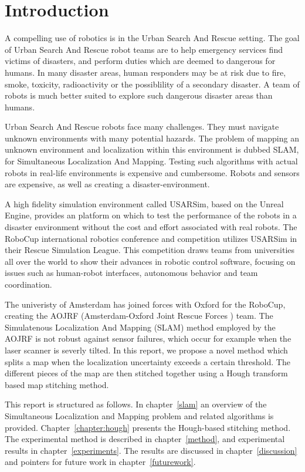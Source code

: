 \chapter{Introduction}
\label{chapter:introduction}
A compelling use of robotics is in the Urban Search And Rescue setting. The goal of Urban Search And Rescue robot teams are to help emergency services find victims of disasters, and perform duties which are deemed to dangerous for humans. In many disaster areas, human responders may be at risk due to fire, smoke, toxicity, radioactivity or the possiblility of a secondary disaster. A team of robots is much better suited to explore such dangerous disaster areas than humans. 

Urban Search And Rescue robots face many challenges. They must navigate unknown environments with many potential hazards. The problem of mapping an unknown environment and localization within this environment is dubbed SLAM, for Simultaneous Localization And Mapping. Testing such algorithms with actual robots in real-life environments is expensive and cumbersome. Robots and sensors are expensive, as well as creating a disaster-environment. 

A high fidelity simulation environment called USARSim, based on the Unreal Engine, provides an platform on which to test the performance of the robots in a disaster environment without the cost and effort associated with real robots. The RoboCup international robotics conference and competition utilizes USARSim in their Rescue Simulation League. This competition draws teams from universities all over the world to show their advances in robotic control software, focusing on issues such as human-robot interfaces, autonomous behavior and team coordination.

The univeristy of Amsterdam has joined forces with Oxford for the RoboCup, creating the AOJRF (Amsterdam-Oxford Joint Rescue Forces \cite{aojrf2011}) team. The Simulatenous Localization And Mapping (SLAM) method employed by the AOJRF is not robust against sensor failures, which occur for example when the laser scanner is severly tilted.  In this report, we propose a novel method which splits a map when the localization uncertainty exceeds a certain threshold. The different pieces of the map are then stitched together using a Hough transform based map stitching method.

This report is structured as follows. In chapter~\ref{slam} an overview of the Simultaneous Localization and Mapping problem and related algorithms is provided. Chapter~\ref{chapter:hough} presents the Hough-based stitching method. The experimental method is described in chapter~\ref{method}, and experimental results in chapter~\ref{experiments}. The results are discussed in chapter~\ref{discussion} and pointers for future work in chapter~\ref{futurework}.